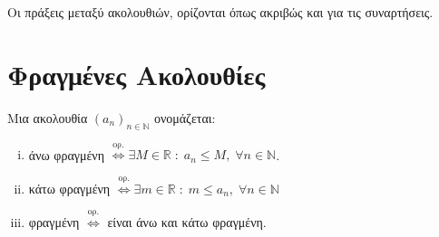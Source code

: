 \begin{mybox1}
  \begin{dfn}
    Οι πράξεις μεταξύ ακολουθιών, ορίζονται όπως ακριβώς και για τις συναρτήσεις.
  \end{dfn}
\end{mybox1}


\section{Φραγμένες Ακολουθίες}

\begin{mybox1}
  \begin{dfn}
    Μια ακολουθία $ (a_{n})_{n \in \mathbb{N}} $ ονομάζεται:
    \begin{enumerate}[i)]
      \item \textcolor{Col1}{άνω φραγμένη} 
        $ \overset{\text{ορ.}}{\Leftrightarrow} \exists M \in 
        \mathbb{R} \; : \; a_{n} \leq M, \; \forall n \in \mathbb{N}$.
      \item \textcolor{Col1}{κάτω φραγμένη} 
        $ \overset{\text{ορ.}}{\Leftrightarrow} \exists m \in 
        \mathbb{R} \; : \; m \leq a_{n}, \; \forall n \in \mathbb{N}  $
      \item \textcolor{Col1}{φραγμένη} 
        $ \overset{\text{ορ.}}{\Leftrightarrow} $ είναι άνω και κάτω φραγμένη.
    \end{enumerate}
  \end{dfn}
\end{mybox1}

